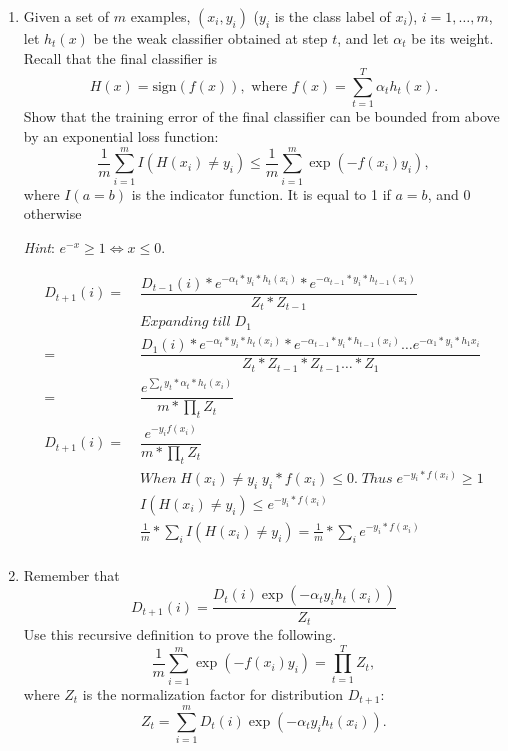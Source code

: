 \documentclass[english]{article}
\begin{document}
\begin{enumerate}
\item Given a set of $m$ examples, $(x_i,y_i)$ ($y_i$ is
  the class label of $x_i$), $i=1,\ldots,m$, let $h_t(x)$ be the weak
  classifier obtained at step $t$, and let $\alpha_t$ be its
  weight. Recall that the final classifier is
  \[
  H(x) = \mbox{sign} (f(x)), \mbox{ where } f(x) = \sum_{t=1}^T
  \alpha_t h_t(x).
  \]
  Show that the training error of the final classifier can be bounded
  from above by an exponential loss function:
  \[
  \frac{1}{m} \sum_{i=1}^m I(H(x_i) \neq y_i) \leq \frac{1}{m}
  \sum_{i=1}^m \exp( -f(x_i) y_i),
  \]
  where $I(a=b)$ is the indicator function. It is equal to 1 if $a=b$,
  and 0 otherwise

  {\em Hint}: $e^{-x} \geq 1 \Leftrightarrow x \leq 0$. 

\begin{align*}
	D_{t+1}(i) =&\; \dfrac{D_{t-1}(i) * e ^{-\alpha_t * y_i * h_t(x_i)} * e^{-\alpha_{t-1} * y_{i} * h_{t-1}(x_i)}}
				{Z_t * Z_{t-1}} \\
	&\;Expanding \; till \; D_1 \\
	=&\;\dfrac{D_1(i) *  e^ {-\alpha_t * y_i * h_t (x_i) } * e^{-\alpha_{t-1}*y_i*h_{t-1}(x_i)} \ldots e^{-\alpha_1 * y_i * h_1{x_i}}}
		       {Z_t * Z_{t-1} * Z_{t-1} \ldots * Z_1} \\
	=&\; \dfrac{e^{\sum_t {y_t * \alpha_t * h_t(x_i)}}}
		        {m * \prod_t{Z_t}} \\
	D_{t+1}(i) =&\; \dfrac {e^{-y_i f(x_i)}} {m * \prod_t Z_t} \\
	&\;When \; H(x_i) \neq y_i \; y_i * f(x_i) \leq 0. \; Thus \; e^{-y_i*f(x_i)} \geq 1\\
	&\;I(H(x_i) \neq y_i) \leq e^{-y_i*f(x_i)} \\
	&\;\frac{1}{m} * \sum_i {I(H(x_i) \neq y_i)} = \frac{1}{m} * \sum_i {e^{-y_i*f(x_i)}}\\
\end{align*}


\item 
  Remember that
  \[D_{t+1}(i)=\frac{D_t(i)\exp(-\alpha_ty_ih_t(x_i))}{Z_t}\] Use this
  recursive definition to prove the following.
  \begin{equation}
    \label{boosting:upper bound} \frac{1}{m} \sum_{i=1}^m \exp( -f(x_i)
    y_i) = \prod_{t=1}^T Z_t,
  \end{equation}
  where $Z_t$ is the normalization factor for distribution $D_{t+1}$:
  \begin{equation}
    \label{boosting:normalization_expression} Z_t = \sum_{i=1}^m D_t(i)
    \exp(-\alpha_t y_i h_t(x_i)).
  \end{equation}


\end{enumerate}
\end{document}
